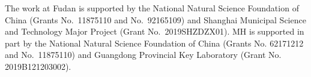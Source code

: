 \documentclass[aop]{imsart}
\theoremstyle{plain}
\theoremstyle{remark}
\newcommand{\1}{\operatorname{\uppercase\expandafter{\romannumeral1}}}
\newcommand{\2}{\operatorname{\uppercase\expandafter{\romannumeral2}}}
\newcommand{\3}{\operatorname{\uppercase\expandafter{\romannumeral3}}}
\newcommand{\4}{\operatorname{\uppercase\expandafter{\romannumeral4}}}
\newcommand{\5}{\operatorname{\uppercase\expandafter{\romannumeral5}}}
\newcommand{\6}{\operatorname{\uppercase\expandafter{\romannumeral6}}}
\newcommand{\7}{\operatorname{\uppercase\expandafter{\romannumeral7}}}
\newcommand{\8}{\operatorname{\uppercase\expandafter{\romannumeral8}}}
\newcommand{\9}{\operatorname{\uppercase\expandafter{\romannumeral9}}}
\begin{document}
\begin{funding}
The work at Fudan is  supported by   the National Natural Science Foundation of China (Grants No.~11875110 and No.~92165109) and  Shanghai Municipal Science and Technology Major Project (Grant No.~2019SHZDZX01).
MH is supported in part by the National Natural Science Foundation of China (Grants No. 62171212 and No.~11875110) and
Guangdong Provincial Key Laboratory (Grant No. 2019B121203002).
\end{funding}



%

\end{document}
